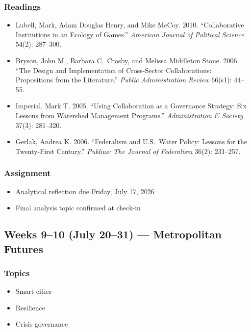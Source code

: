 \documentclass[12pt]{article}
\begin{document}
    \subsubsection*{Readings}
        \begin{itemize}
            \item Lubell, Mark, Adam Douglas Henry, and Mike McCoy. 2010. ``Collaborative Institutions in an Ecology of Games.'' \emph{American Journal of Political Science} 54(2): 287--300.
            \item Bryson, John M., Barbara C.\ Crosby, and Melissa Middleton Stone. 2006. ``The Design and Implementation of Cross-Sector Collaborations: Propositions from the Literature.'' \emph{Public Administration Review} 66(s1): 44--55.
            \item Imperial, Mark T. 2005. ``Using Collaboration as a Governance Strategy: Six Lessons from Watershed Management Programs.'' \emph{Administration \& Society} 37(3): 281--320.
            \item Gerlak, Andrea K. 2006. ``Federalism and U.S.\ Water Policy: Lessons for the Twenty-First Century.'' \emph{Publius: The Journal of Federalism} 36(2): 231--257.
        \end{itemize}
    \subsubsection*{Assignment}
        \begin{itemize}
            \item Analytical reflection due Friday, July 17, 2026
            \item Final analysis topic confirmed at check-in
        \end{itemize}

\subsection*{Weeks 9--10 (July 20--31) --- Metropolitan Futures}
    \subsubsection*{Topics}
        \begin{itemize}
            \item Smart cities
            \item Resilience
            \item Crisis governance
        \end{itemize}
\end{document}
